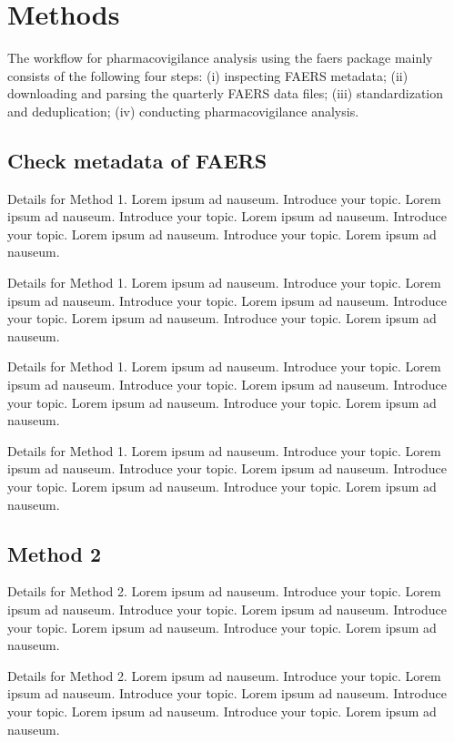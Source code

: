 \documentclass{bioinfo}
\begin{document}
\section{Methods}

The workflow for pharmacovigilance analysis using the faers package
mainly consists of the following four steps: (i) inspecting FAERS
metadata; (ii) downloading and parsing the quarterly FAERS data files;
(iii) standardization and deduplication; (iv) conducting
pharmacovigilance analysis.

\subsection{Check metadata of FAERS}

Details for Method 1. Lorem ipsum ad nauseum. Introduce your topic.
Lorem ipsum ad nauseum. Introduce your topic. Lorem ipsum ad nauseum.
Introduce your topic. Lorem ipsum ad nauseum. Introduce your topic.
Lorem ipsum ad nauseum.

Details for Method 1. Lorem ipsum ad nauseum. Introduce your topic.
Lorem ipsum ad nauseum. Introduce your topic. Lorem ipsum ad nauseum.
Introduce your topic. Lorem ipsum ad nauseum. Introduce your topic.
Lorem ipsum ad nauseum.

Details for Method 1. Lorem ipsum ad nauseum. Introduce your topic.
Lorem ipsum ad nauseum. Introduce your topic. Lorem ipsum ad nauseum.
Introduce your topic. Lorem ipsum ad nauseum. Introduce your topic.
Lorem ipsum ad nauseum.

Details for Method 1. Lorem ipsum ad nauseum. Introduce your topic.
Lorem ipsum ad nauseum. Introduce your topic. Lorem ipsum ad nauseum.
Introduce your topic. Lorem ipsum ad nauseum. Introduce your topic.
Lorem ipsum ad nauseum.

\subsection{Method 2}

Details for Method 2. Lorem ipsum ad nauseum. Introduce your topic.
Lorem ipsum ad nauseum. Introduce your topic. Lorem ipsum ad nauseum.
Introduce your topic. Lorem ipsum ad nauseum. Introduce your topic.
Lorem ipsum ad nauseum.

Details for Method 2. Lorem ipsum ad nauseum. Introduce your topic.
Lorem ipsum ad nauseum. Introduce your topic. Lorem ipsum ad nauseum.
Introduce your topic. Lorem ipsum ad nauseum. Introduce your topic.
Lorem ipsum ad nauseum.
\end{document}

